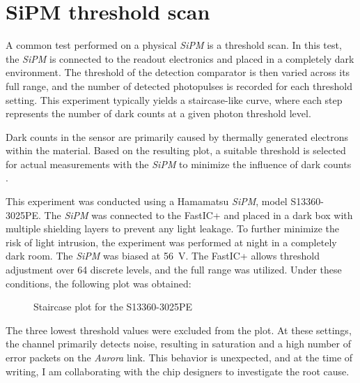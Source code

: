 \section{SiPM threshold scan}
A common test performed on a physical \emph{SiPM} is a threshold scan. In this test, the \emph{SiPM} is connected to the readout electronics and placed in a completely dark environment. The threshold of the detection comparator is then varied across its full range, and the number of detected photopulses is recorded for each threshold setting. This experiment typically yields a staircase-like curve, where each step represents the number of dark counts at a given photon threshold level. \cite{onsemiAND9770}


Dark counts in the sensor are primarily caused by thermally generated electrons within the material. Based on the resulting plot, a suitable threshold is selected for actual measurements with the \emph{SiPM} to minimize the influence of dark counts \cite{onsemiAND9770}.

This experiment was conducted using a Hamamatsu \emph{SiPM}, model S13360-3025PE. The \emph{SiPM} was connected to the FastIC+ and placed in a dark box with multiple shielding layers to prevent any light leakage. To further minimize the risk of light intrusion, the experiment was performed at night in a completely dark room. The \emph{SiPM} was biased at \SI{56}{\volt}. The FastIC+ allows threshold adjustment over 64 discrete levels, and the full range was utilized. Under these conditions, the following plot was obtained:

\FloatBarrier
\begin{figure}[!htpb]
\begin{center}
\caption{Staircase plot for the S13360-3025PE}
\label{fig:staircase_plot}
\end{center}
\end{figure}
\FloatBarrier

The three lowest threshold values were excluded from the plot. At these settings, the channel primarily detects noise, resulting in saturation and a high number of error packets on the \emph{Aurora} link. This behavior is unexpected, and at the time of writing, I am collaborating with the chip designers to investigate the root cause.

